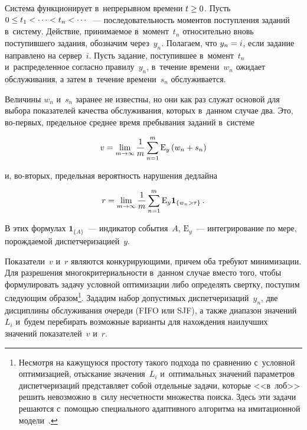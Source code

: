 \begin{multicols}{2}
  Система функционирует в~непрерывном времени $t\hm\geq0$. Пусть 
$0\hm\leq t_1<\cdots< t_n<\cdots$~--- последовательность моментов поступления 
заданий в~систему. Действие, принимаемое в~момент~$t_n$ относительно вновь 
поступившего задания, обозначим через~$y_n$. Полагаем, что $y_n\hm=i$, если 
задание на\-прав\-ле\-но на сервер~$i$. Пусть задание, поступившее в~момент~$t_n$ 
и~распределенное согласно правилу~$y_n$, в~течение времени~$w_n$ ожидает 
обслуживания, а затем в~течение времени~$s_n$ обслуживается.
  
  Величины $w_n$ и~$s_n$ заранее не известны, но они как раз служат 
основой для выбора показателей качества обслуживания, которых в~данном 
случае два. Это, во-пер\-вых, предельное среднее время пребывания заданий 
в~системе

\vspace*{2pt}

\noindent
  $$
  v=\lim\limits_{m\to\infty} \displaystyle\frac{\displaystyle 1\mathstrut}{\displaystyle m\mathstrut}\sum\limits^m_{n=1} \mathrm{E}_y\left( 
w_n+s_n\right)
  $$
  
  \vspace*{-3pt}
  
  \noindent
и, во-вторых, предельная вероятность нарушения дедлайна

\noindent
$$
r=\lim\limits_{m\to\infty} \displaystyle\frac{\displaystyle 1\mathstrut}{\displaystyle m\mathstrut}\sum\limits^m_{n=1} 
\mathrm{E}_y\mathbf{1}_{\{w_n>\tau\}}\,.
$$

\vspace*{-2pt}
  
  В этих формулах $\mathbf{1}_{\{A\}}$~--- индикатор события~$A$, 
$\mathrm{E}_y$~--- интегрирование по мере, порождаемой 
диспетчеризацией~$y$.
  
  Показатели~$v$ и~$r$ являются конкурирующими, причем оба требуют 
минимизации. Для разрешения многокритериальности в~данном случае вместо 
того, чтобы формулировать задачу условной оптимизации либо определять 
свертку, поступим следующим образом\footnote[3]{Несмотря на кажущуюся простоту 
такого подхода по сравнению с~условной оптимизацией, отыскание значения~$L_i$ и~оптимальных 
значений параметров диспетчеризаций представляет собой отдельные задачи, которые <<в~лоб>> 
решить невозможно в~силу несчетности множества поиска. Здесь эти задачи решаются с~помощью 
специального адаптивного алгоритма на имитационной модели~\cite{7-kon}.}. 
Зададим набор 
допустимых диспетчеризаций~$y_n$, две дисциплины обслуживания очереди 
(FIFO или SJF), а также диапазон значений~$L_i$ и~будем перебирать 
возможные варианты для нахождения наилучших значений показателей~$v$ 
и~$r$.


\end{multicols}
